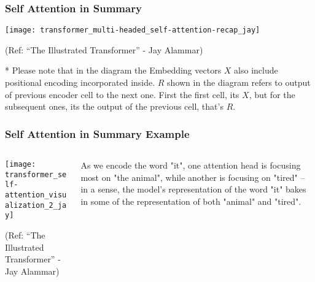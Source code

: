 \begin{frame}[fragile]\frametitle{Self Attention in Summary}


\begin{center}
\texttt{[image: transformer\_multi-headed\_self-attention-recap\_jay]}


{\tiny (Ref: ``The Illustrated Transformer'' - Jay Alammar)}
\end{center}	


* Please note that in the diagram the Embedding vectors $X$ also include positional encoding incorporated inside.	$R$ shown in the diagram refers to output of previous encoder cell to the next one. First the first cell, its $X$, but for the subsequent ones, its the output of the previous cell, that's $R$.

\end{frame}


\begin{frame}[fragile]\frametitle{Self Attention in Summary Example}

\begin{columns}
    \begin{column}[T]{0.5\linewidth}
\begin{center}
\texttt{[image: transformer\_self-attention\_visualization\_2\_jay]}


{\tiny (Ref: ``The Illustrated Transformer'' - Jay Alammar)}
\end{center}	
		\end{column}
    \begin{column}[T]{0.5\linewidth}

As we encode the word "it", one attention head is focusing most on "the animal", while another is focusing on "tired" -- in a sense, the model's representation of the word "it" bakes in some of the representation of both "animal" and "tired".
    \end{column}
  \end{columns}
\end{frame}

